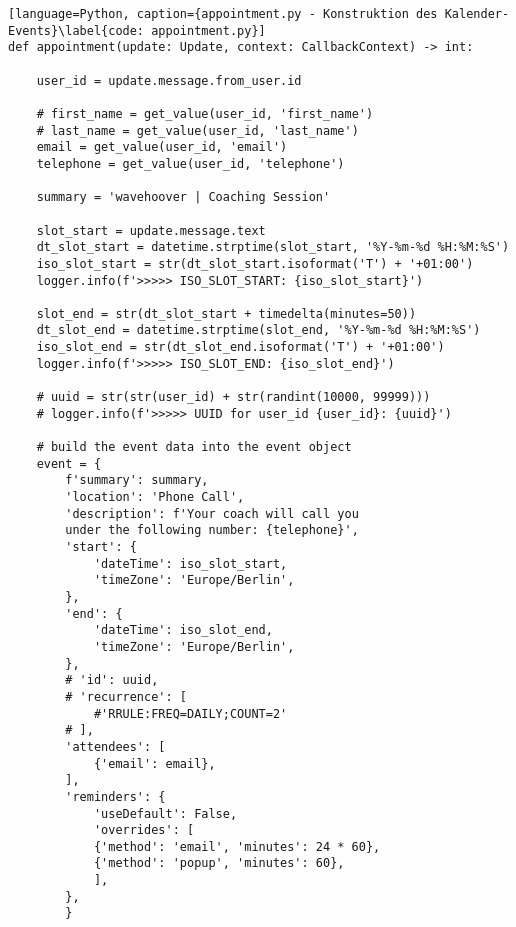         \begin{lstlisting}[language=Python, caption={appointment.py - Konstruktion des Kalender-Events}\label{code: appointment.py}]
def appointment(update: Update, context: CallbackContext) -> int:

    user_id = update.message.from_user.id

    # first_name = get_value(user_id, 'first_name')
    # last_name = get_value(user_id, 'last_name')
    email = get_value(user_id, 'email')
    telephone = get_value(user_id, 'telephone')

    summary = 'wavehoover | Coaching Session'
    
    slot_start = update.message.text
    dt_slot_start = datetime.strptime(slot_start, '%Y-%m-%d %H:%M:%S')
    iso_slot_start = str(dt_slot_start.isoformat('T') + '+01:00')
    logger.info(f'>>>>> ISO_SLOT_START: {iso_slot_start}')

    slot_end = str(dt_slot_start + timedelta(minutes=50))
    dt_slot_end = datetime.strptime(slot_end, '%Y-%m-%d %H:%M:%S')
    iso_slot_end = str(dt_slot_end.isoformat('T') + '+01:00')
    logger.info(f'>>>>> ISO_SLOT_END: {iso_slot_end}')

    # uuid = str(str(user_id) + str(randint(10000, 99999)))
    # logger.info(f'>>>>> UUID for user_id {user_id}: {uuid}')

    # build the event data into the event object
    event = {
        f'summary': summary,
        'location': 'Phone Call',
        'description': f'Your coach will call you 
        under the following number: {telephone}',
        'start': {
            'dateTime': iso_slot_start,
            'timeZone': 'Europe/Berlin',
        },
        'end': {
            'dateTime': iso_slot_end,
            'timeZone': 'Europe/Berlin',
        },
        # 'id': uuid,
        # 'recurrence': [
            #'RRULE:FREQ=DAILY;COUNT=2'
        # ],
        'attendees': [
            {'email': email},
        ],
        'reminders': {
            'useDefault': False,
            'overrides': [
            {'method': 'email', 'minutes': 24 * 60},
            {'method': 'popup', 'minutes': 60},
            ],
        },
        }
        \end{lstlisting}

